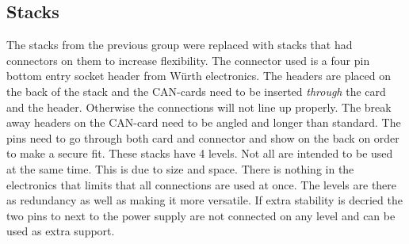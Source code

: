 \subsection{Stacks} %
The stacks from the previous group were replaced with stacks that had connectors on them to increase flexibility. The connector used is a four pin bottom entry socket header from Würth electronics. The headers are placed on the back of the stack and the CAN-cards need to be inserted \emph{through} the card and the header. Otherwise the connections will not line up properly. The break away headers on the CAN-card need to be angled and longer than standard. The pins need to go through both card and connector and show on the back on order to make a secure fit. These stacks have 4 levels. Not all are intended to be used at the same time. This is due to size and space. There is nothing in the electronics that limits that all connections are used at once. The levels are there as redundancy as well as making it more versatile. If extra stability is decried the two pins to next to the power supply are not connected on any level and can be used as extra support.
